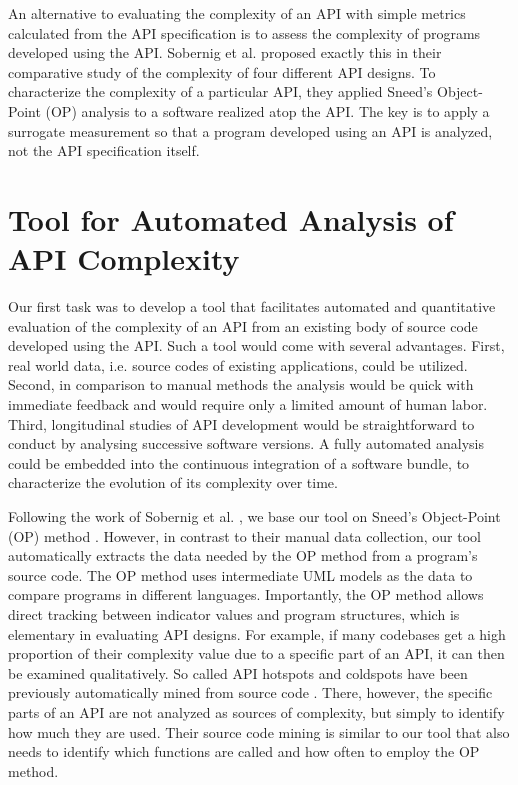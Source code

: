 \documentclass[conference]{IEEEtran}
\begin{document}
An alternative to evaluating the complexity of an API with simple
metrics calculated from the API specification is to assess the
complexity of programs developed using the API. Sobernig et
al. \cite{api-complexity-analysis} proposed exactly this in their
comparative study of the complexity of four different API designs. To
characterize the complexity of a particular API, they applied Sneed’s
\cite{Sneed} Object-Point (OP) analysis to a software realized atop the
API. The key is to apply a surrogate measurement so that a program
developed using an API is analyzed, not the API specification itself.


\section{Tool for Automated Analysis of API Complexity%
  \label{tool-for-automated-analysis-of-api-complexity}%
}

Our first task was to develop a tool that facilitates automated and
quantitative evaluation of the complexity of an API from an existing
body of source code developed using the API. Such a tool would come
with several advantages. First, real world data, i.e. source codes of
existing applications, could be utilized. Second, in comparison to
manual methods the analysis would be quick with immediate feedback and
would require only a limited amount of human labor. Third,
longitudinal studies of API development would be straightforward to
conduct by analysing successive software versions. A fully automated
analysis could be embedded into the continuous integration of a
software bundle, to characterize the evolution of its complexity over
time.

Following the work of Sobernig et al. \cite{api-complexity-analysis}, we
base our tool on Sneed’s Object-Point (OP) method \cite{Sneed}. However, in
contrast to their manual data collection, our tool automatically
extracts the data needed by the OP method from a program’s source
code. The OP method uses intermediate UML models as the data to
compare programs in different languages. Importantly, the OP method
allows direct tracking between indicator values and program
structures, which is elementary in evaluating API designs. For
example, if many codebases get a high proportion of their complexity
value due to a specific part of an API, it can then be examined
qualitatively. So called API hotspots and coldspots have been
previously automatically mined from source code \cite{spotweb}. There,
however, the specific parts of an API are not analyzed as sources of
complexity, but simply to identify how much they are used. Their
source code mining is similar to our tool that also needs to identify
which functions are called and how often to employ the OP method.
\end{document}
